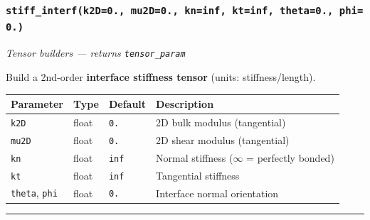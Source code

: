 \documentclass[
  a4paper,
  numbers=noendperiod,
  DIV=12]{scrreprt}
\newcounter{none} %
\begin{document}
\subsubsection{\texorpdfstring{\texttt{stiff\_interf(k2D=0.,\ mu2D=0.,\ kn=inf,\ kt=inf,\ theta=0.,\ phi=0.)}}{stiff\_interf(k2D=0., mu2D=0., kn=inf, kt=inf, theta=0., phi=0.)}}\label{api-stiff-interf}

\emph{Tensor builders --- returns \texttt{tensor\_param}}

Build a 2nd-order \textbf{interface stiffness tensor} (units:
stiffness/length).

{\def\LTcaptype{none} %
\begin{longtable}[]{@{}
  >{\raggedright\arraybackslash}p{}
  >{\raggedright\arraybackslash}p{}
  >{\raggedright\arraybackslash}p{}
  >{\raggedright\arraybackslash}p{}@{}}
\toprule\noalign{}
\begin{minipage}[b]{\linewidth}\raggedright
Parameter
\end{minipage} & \begin{minipage}[b]{\linewidth}\raggedright
Type
\end{minipage} & \begin{minipage}[b]{\linewidth}\raggedright
Default
\end{minipage} & \begin{minipage}[b]{\linewidth}\raggedright
Description
\end{minipage} \\
\midrule\noalign{}
\endhead
\bottomrule\noalign{}
\endlastfoot
\texttt{k2D} & float & \texttt{0.} & 2D bulk modulus (tangential) \\
\texttt{mu2D} & float & \texttt{0.} & 2D shear modulus (tangential) \\
\texttt{kn} & float & \texttt{inf} & Normal stiffness (\(\infty\) =
perfectly bonded) \\
\texttt{kt} & float & \texttt{inf} & Tangential stiffness \\
\texttt{theta}, \texttt{phi} & float & \texttt{0.} & Interface normal
orientation \\
\end{longtable}
}

\begin{center}\rule{0.5\linewidth}{0.5pt}\end{center}
\end{document}
